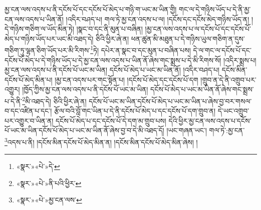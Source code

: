 མྱ་ངན་ལས་འདས་པ་ནི་དངོས་པོ་དང་དངོས་པོ་མེད་པ་གཉི་ག་ཡང་མ་ཡིན་གྱི། གང་ལ་དེ་གཉིས་ཡོད་པ་དེ་ནི་མྱ་ངན་ལས་འདས་པ་ཡིན་ནོ། །འདིར་བཤད་པ། གལ་ཏེ་མྱ་ངན་འདས་པ་ལ། །དངོས་དང་དངོས་མེད་གཉིས་ཡོད་ན། །དེ་གཉིས་གཅིག་ལ་ཡོད་མིན་ཏེ། །སྣང་བ་དང་ནི་མུན་པ་བཞིན། །མྱ་ངན་ལས་འདས་པ་ལ་དངོས་པོ་དང་དངོས་པོ་མེད་པ་གཉིས་ཡོད་པར་ཡང་མི་འཐད་དེ། ཅིའི་ཕྱིར་ཞེ་ན། ཕན་ཚུན་མི་མཐུན་པ་དེ་གཉིས་ཡུལ་གཅིག་ན་དུས་གཅིག་ཏུ་ལྷན་ཅིག་ཡོད་པར་མི་རིགས་\footnote{«སྣར་»«པེ་»དེ་}ཏེ། དཔེར་ན་སྣང་བ་དང་མུན་པ་བཞིན་པས། དེ་ལ་གང་ལ་དངོས་པོ་དང་དངོས་པོ་མེད་པ་དེ་གཉིས་ཡོད་པ་དེ་མྱ་ངན་ལས་འདས་པ་ཡིན་ནོ་ཞེས་གང་སྨྲས་པ་དེ་མི་རིགས་སོ། །འདིར་སྨྲས་པ། མྱ་ངན་ལས་འདས་པ་ནི་དངོས་པོ་ཡང་མ་ཡིན། དངོས་པོ་མེད་པ་ཡང་མ་ཡིན་ནོ། །འདིར་བཤད་པ། དངོས་མིན་དངོས་པོ་མེད་མིན་པ། །མྱ་ངན་འདས་པར་གང་སྟོན་པ། །དངོས་པོ་མེད་དང་དངོས་པོ་དག །གྲུབ་ན་དེ་ནི་འགྲུབ་པར་འགྱུར། །ཁྱོད་ཀྱིས་མྱ་ངན་ལས་འདས་པ་ནི་དངོས་པོ་ཡང་མ་ཡིན། དངོས་པོ་མེད་པ་ཡང་མ་ཡིན་ནོ་ཞེས་གང་སྨྲས་པ་དེ་ནི་\footnote{«སྣར་»«པེ་»ནི་པའི་ཕྱིར་}མི་འཐད་དེ། ཅིའི་ཕྱིར་ཞེ་ན། དངོས་པོ་ཡང་མ་ཡིན་དངོས་པོ་མེད་པ་ཡང་མ་ཡིན་པ་ཞེས་བྱ་བར་གསལ་བ་དང་འཛིན་པ་དང་། རྩོལ་བའི་བློ་གང་ཡིན་པ་དེ་ནི་དངོས་པོ་མེད་པ་དང་དངོས་པོ་དག་གྲུབ་ན། དེ་ཡང་འགྲུབ་པར་འགྱུར་བ་ཡིན་ན། དངོས་པོ་མེད་པ་དང་དངོས་པོ་དེ་དག་མ་གྲུབ་པས། དེའི་ཕྱིར་མྱ་ངན་ལས་འདས་པ་དངོས་པོ་ཡང་མ་ཡིན་དངོས་པོ་མེད་པ་ཡང་མ་ཡིན་ནོ་ཞེས་བྱ་བ་དེ་མི་འཐད་དོ། །ཡང་གཞན་ཡང་། གལ་ཏེ་:མྱ་ངན་\footnote{«སྣར་»«པེ་»མྱ་ངན་ལས་}འདས་པ་ནི། །དངོས་མིན་དངོས་པོ་མེད་མིན་ན། །དངོས་མིན་དངོས་པོ་མེད་མིན་ཞེས། །
